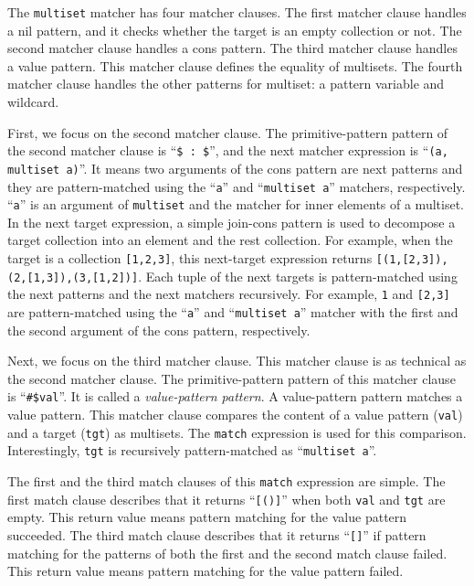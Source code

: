 \documentclass{article}
\begin{document}
The \texttt{multiset} matcher has four matcher clauses.
The first matcher clause handles a nil pattern, and it checks whether the target is an empty collection or not.
The second matcher clause handles a cons pattern.
The third matcher clause handles a value pattern.
This matcher clause defines the equality of multisets.
The fourth matcher clause handles the other patterns for multiset: a pattern variable and wildcard.

\medskip

First, we focus on the second matcher clause.
The primitive-pattern pattern of the second matcher clause is ``\verb|$ : $|'', and the next matcher expression is ``\verb|(a, multiset a)|''.
It means two arguments of the cons pattern are next patterns and they are pattern-matched using the ``\verb|a|'' and ``\verb|multiset a|'' matchers, respectively.
``\verb|a|'' is an argument of \texttt{multiset} and the matcher for inner elements of a multiset.
In the next target expression, a simple join-cons pattern is used to decompose a target collection into an element and the rest collection.
For example, when the target is a collection \texttt{[1,2,3]}, this next-target expression returns \texttt{[(1,[2,3]),(2,[1,3]),(3,[1,2])]}.
Each tuple of the next targets is pattern-matched using the next patterns and the next matchers recursively.
For example, \texttt{1} and \texttt{[2,3]} are pattern-matched using the ``\texttt{a}'' and ``\texttt{multiset a}'' matcher with the first and the second argument of the cons pattern, respectively.

\medskip

Next, we focus on the third matcher clause.
This matcher clause is as technical as the second matcher clause.
The primitive-pattern pattern of this matcher clause is ``\verb|#$val|''.
It is called a \emph{value-pattern pattern}.
A value-pattern pattern matches a value pattern.
This matcher clause compares the content of a value pattern (\texttt{val}) and a target (\texttt{tgt}) as multisets.
The \texttt{match} expression is used for this comparison.
Interestingly, \verb|tgt| is recursively pattern-matched as ``\texttt{multiset a}''.

The first and the third match clauses of this \texttt{match} expression are simple.
The first match clause describes that it returns ``\verb|[()]|'' when both \texttt{val} and \texttt{tgt} are empty.
This return value means pattern matching for the value pattern succeeded.
The third match clause describes that it returns ``\verb|[]|'' if pattern matching for the patterns of both the first and the second match clause failed.
This return value means pattern matching for the value pattern failed.
\end{document}
